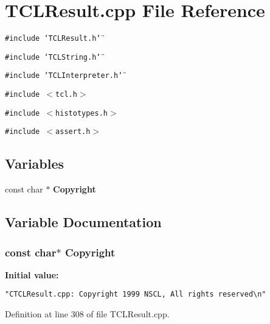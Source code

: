 \section{TCLResult.cpp File Reference}
\label{TCLResult_8cpp}
{\tt \#include \char`\"{}TCLResult.h\char`\"{}}\par
{\tt \#include \char`\"{}TCLString.h\char`\"{}}\par
{\tt \#include \char`\"{}TCLInterpreter.h\char`\"{}}\par
{\tt \#include $<$tcl.h$>$}\par
{\tt \#include $<$histotypes.h$>$}\par
{\tt \#include $<$assert.h$>$}\par
\subsection*{Variables}
\begin{CompactItemize}
\item 
const char $\ast$ {\bf Copyright}
\end{CompactItemize}


\subsection{Variable Documentation}
\subsubsection{\setlength{\rightskip}{0pt plus 5cm}const char$\ast$ Copyright\hspace{0.3cm}{\tt  [static]}}\label{TCLResult_8cpp_a0}


{\bf Initial value:}

\footnotesize\begin{verbatim} 
"CTCLResult.cpp: Copyright 1999 NSCL, All rights reserved\n"\end{verbatim}\normalsize 


Definition at line 308 of file TCLResult.cpp.